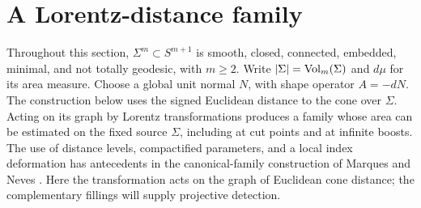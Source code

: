 \section{A Lorentz-distance family}\label{sec:family}

Throughout this section, $\Sigma^m\subset S^{m+1}$ is smooth, closed,
connected, embedded, minimal, and not totally geodesic, with $m\ge2$.
Write $|\Sigma|=\operatorname{Vol}_m(\Sigma)$ and $d\mu$ for its area measure.
Choose a global unit normal $N$, with shape operator $A=-dN$.
The construction below uses the signed Euclidean distance to the cone over
$\Sigma$.  Acting on its graph by Lorentz transformations produces a family
whose area can be estimated on the fixed source $\Sigma$, including at cut
points and at infinite boosts.
The use of distance levels, compactified parameters, and a local index
deformation has antecedents in the canonical-family construction of
Marques and Neves \cite[Sections~2.3 and~10]{MarquesNeves2014}.
Here the transformation acts on the graph of Euclidean cone distance;
the complementary fillings will supply projective detection.

